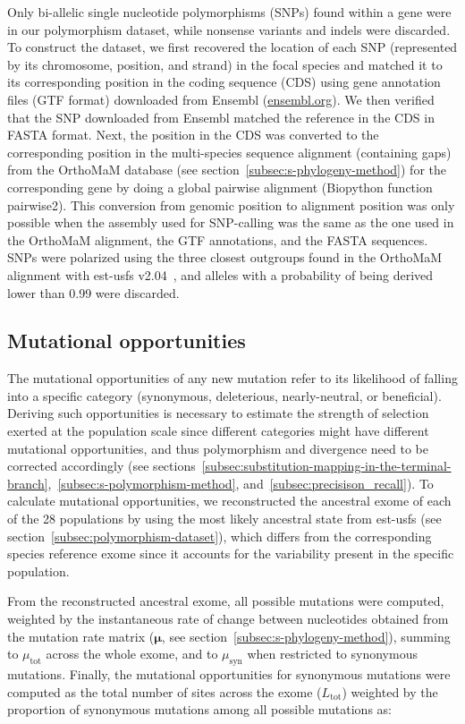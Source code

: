 \documentclass[10pt,letterpaper]{article}
\begin{document}
Only bi-allelic single nucleotide polymorphisms (SNPs) found within a gene were in our polymorphism dataset, while nonsense variants and indels were discarded.
To construct the dataset, we first recovered the location of each SNP (represented by its chromosome, position, and strand) in the focal species and matched it to its corresponding position in the coding sequence (CDS) using gene annotation files (GTF format) downloaded from Ensembl (\url{ensembl.org}).
We then verified that the SNP downloaded from Ensembl matched the reference in the CDS in FASTA format.
Next, the position in the CDS was converted to the corresponding position in the multi-species sequence alignment (containing gaps) from the OrthoMaM database (see section~\ref{subsec:s-phylogeny-method}) for the corresponding gene by doing a global pairwise alignment (Biopython function pairwise2).
This conversion from genomic position to alignment position was only possible when the assembly used for SNP-calling was the same as the one used in the OrthoMaM alignment, the GTF annotations, and the FASTA sequences.
SNPs were polarized using the three closest outgroups found in the OrthoMaM alignment with est-usfs v2.04~\cite{keightley_inferring_2018}, and alleles with a probability of being derived lower than 0.99 were discarded.

\subsection{Mutational opportunities}
\label{subsec:nunber-of-sites}
The mutational opportunities of any new mutation refer to its likelihood of falling into a specific category (synonymous, deleterious, nearly-neutral, or beneficial).
Deriving such opportunities is necessary to estimate the strength of selection exerted at the population scale since different categories might have different mutational opportunities, and thus polymorphism and divergence need to be corrected accordingly (see sections~\ref{subsec:substitution-mapping-in-the-terminal-branch},~\ref{subsec:s-polymorphism-method}, and~\ref{subsec:precisison_recall}).
To calculate mutational opportunities, we reconstructed the ancestral exome of each of the 28 populations by using the most likely ancestral state from est-usfs (see section~\ref{subsec:polymorphism-dataset}), which differs from the corresponding species reference exome since it accounts for the variability present in the specific population.

From the reconstructed ancestral exome, all possible mutations were computed, weighted by the instantaneous rate of change between nucleotides obtained from the mutation rate matrix ($\bm{\mu}$, see section~\ref{subsec:s-phylogeny-method}), summing to $\mu_{\text{tot}}$ across the whole exome, and to $\mu_{\text{syn}}$ when restricted to synonymous mutations.
Finally, the mutational opportunities for synonymous mutations were computed as the total number of sites across the exome ($L_{\text{tot}}$) weighted by the proportion of synonymous mutations among all possible mutations as:
\end{document}
